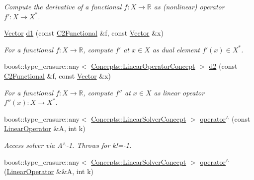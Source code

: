\begin{DoxyCompactItemize}
\begin{DoxyCompactList}\small\item\em Compute the derivative of a functional $ f: X\to \mathbb{R} $ as (nonlinear) operator $ f':X\to X^* $. \end{DoxyCompactList}\item 
\hyperlink{classSpacy_1_1Vector}{Vector} \hyperlink{group__SpacyGroup_gab6646eb7068eb9f1369e639cf0b620a2_gab6646eb7068eb9f1369e639cf0b620a2}{d1} (const \hyperlink{group__SpacyGroup_gaf5b89e117806134b06a1ce4629fb2b65_gaf5b89e117806134b06a1ce4629fb2b65}{C2\+Functional} \&f, const \hyperlink{classSpacy_1_1Vector}{Vector} \&x)
\begin{DoxyCompactList}\small\item\em For a functional $ f: X\to \mathbb{R} $, compute $f'$ at $x\in X$ as dual element $ f'(x) \in X^* $. \end{DoxyCompactList}\item 
boost\+::type\+\_\+erasure\+::any$<$ \hyperlink{group__ConceptGroup_gaf0e18e41c434cfceb77ccb8e785a8055_gaf0e18e41c434cfceb77ccb8e785a8055}{Concepts\+::\+Linear\+Operator\+Concept} $>$ \hyperlink{group__SpacyGroup_ga22f56f6ffd46496e786b435cabca71e0_ga22f56f6ffd46496e786b435cabca71e0}{d2} (const \hyperlink{group__SpacyGroup_gaf5b89e117806134b06a1ce4629fb2b65_gaf5b89e117806134b06a1ce4629fb2b65}{C2\+Functional} \&f, const \hyperlink{classSpacy_1_1Vector}{Vector} \&x)
\begin{DoxyCompactList}\small\item\em For a functional $ f: X\to \mathbb{R} $, compute $f''$ at $x\in X$ as linear opeator $ f''(x): X \to X^* $. \end{DoxyCompactList}\item 
\hypertarget{group__SpacyGroup_ga59dbadcd7afe1450933406e614381038}{}boost\+::type\+\_\+erasure\+::any$<$ \hyperlink{group__ConceptGroup_gac7d6a94c7131c8613e2ab26fddeb50bd_gac7d6a94c7131c8613e2ab26fddeb50bd}{Concepts\+::\+Linear\+Solver\+Concept} $>$ \hyperlink{group__SpacyGroup_ga59dbadcd7afe1450933406e614381038}{operator$^\wedge$} (const \hyperlink{group__SpacyGroup_ga584f7b9d82a844302ba0d77c3a1b6640_ga584f7b9d82a844302ba0d77c3a1b6640}{Linear\+Operator} \&A, int k)\label{group__SpacyGroup_ga59dbadcd7afe1450933406e614381038}

\begin{DoxyCompactList}\small\item\em Access solver via A$^\wedge$-\/1. Throws for k!=-\/1. \end{DoxyCompactList}\item 
\hypertarget{group__SpacyGroup_gab598ac107e22bc6d409a77d3335ac85d}{}boost\+::type\+\_\+erasure\+::any$<$ \hyperlink{group__ConceptGroup_gac7d6a94c7131c8613e2ab26fddeb50bd_gac7d6a94c7131c8613e2ab26fddeb50bd}{Concepts\+::\+Linear\+Solver\+Concept} $>$ \hyperlink{group__SpacyGroup_gab598ac107e22bc6d409a77d3335ac85d}{operator$^\wedge$} (\hyperlink{group__SpacyGroup_ga584f7b9d82a844302ba0d77c3a1b6640_ga584f7b9d82a844302ba0d77c3a1b6640}{Linear\+Operator} \&\&A, int k)\label{group__SpacyGroup_gab598ac107e22bc6d409a77d3335ac85d}


\end{DoxyCompactItemize}
